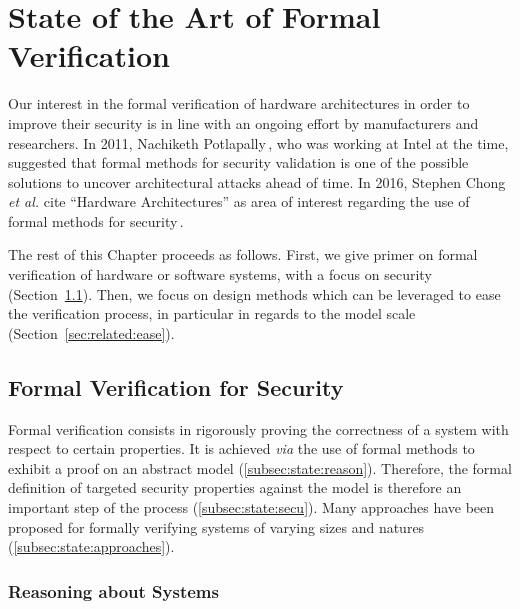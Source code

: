 \chapter{State of the Art of Formal Verification}
\label{chapter:relatedwork}


\vspace{1cm}\noindent
%
Our interest in the formal verification of hardware architectures in order to
improve their security is in line with an ongoing effort by manufacturers and
researchers.
%
In 2011, Nachiketh Potlapally\,\cite{potlapally2011hardwaresecurity}, who was
working at Intel at the time, suggested that formal methods for security
validation is one of the possible solutions to uncover architectural attacks
ahead of time.
%
In 2016, Stephen Chong \emph{et al.} cite ``Hardware Architectures'' as area of
interest regarding the use of formal methods for
security\,\cite{chong2016report}.

The rest of this Chapter proceeds as follows.
%
First, we give primer on formal verification of hardware or software systems,
with a focus on security (Section~\ref{sec:related:review}).
%
Then, we focus on design methods which can be leveraged to ease the verification
process, in particular in regards to the model scale
(Section~\ref{sec:related:ease}).

\section{Formal Verification for Security}
\label{sec:related:review}

Formal verification consists in rigorously proving the correctness of a system
with respect to certain properties.
%
It is achieved \emph{via} the use of formal methods to exhibit a proof on an
abstract model (\ref{subsec:state:reason}).
%
Therefore, the formal definition of targeted security properties against the
model is therefore an important step of the process (\ref{subsec:state:secu}).
%
Many approaches have been proposed for formally verifying systems of varying
sizes and natures (\ref{subsec:state:approaches}).

\subsection{Reasoning about Systems} 
\label{subsec:state:reason}

